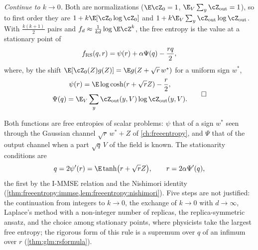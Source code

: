\begin{refsection}
\begin{heuristic}
\emph{Continue to $k\to0$.} Both are normalizations ($\E\cZ_0=1$, $\E_V\sum_y\glmZout=1$), so to first order they are $1+k\E[\cZ_0\log\cZ_0]$ and $1+k\E_V\sum_y\glmZout\log\glmZout$. With $\frac{k(k+1)}2$ pairs and $f_d\approx\frac1{kd}\log\E\cZ^k$, the free entropy is the value at a stationary point of
\begin{equation}\label{eq:glm:frs}
f_{\mathrm{RS}}(q,r)=\psi(r)+\alpha\Psi(q)-\frac{rq}2,
\end{equation}
where, by the shift $\E[\cZ_0(Z)g(Z)]=\E g(Z+\sqrt r\,w^*)$ for a uniform sign $w^*$,
\begin{equation}\label{eq:glm:channels}
\begin{gathered}
\psi(r)=\E\log\cosh(r+\sqrt rZ)-\frac r2,\\
\Psi(q)=\E_V\sum_y\glmZout(y,V)\log\glmZout(y,V).
\end{gathered}\qedhere
\end{equation}
\end{heuristic}

Both functions are free entropies of scalar problems: $\psi$ that of a sign $w^*$ seen through the Gaussian channel $\sqrt r\,w^*+Z$ of \cref{ch:freeentropy}, and $\Psi$ that of the output channel when a part $\sqrt q\,V$ of the field is known. The stationarity conditions are
\begin{equation}\label{eq:glm:fixed}
q=2\psi'(r)=\E\tanh\bigl(r+\sqrt rZ\bigr),\qquad r=2\alpha\Psi'(q),
\end{equation}
the first by the I-MMSE relation and the Nishimori identity (\cref{thm:freeentropy:immse,lem:freeentropy:nishimori}). Five steps are not justified: the continuation from integers to $k\to0$, the exchange of $k\to0$ with $d\to\infty$, Laplace's method with a non-integer number of replicas, the replica-symmetric ansatz, and the choice among stationary points, where physicists take the largest free entropy; the rigorous form of this rule is a supremum over $q$ of an infimum over $r$ (\cref{thm:glm:rsformula}).


\end{refsection}
